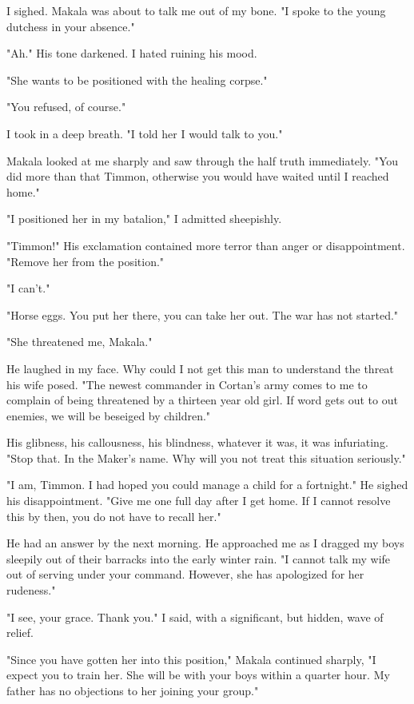 \documentclass{article}
\begin{document}
I sighed. Makala was about to talk me out of my bone. "I spoke to the young dutchess in your absence."

"Ah." His tone darkened. I hated ruining his mood.

"She wants to be positioned with the healing corpse."

"You refused, of course."

I took in a deep breath. "I told her I would talk to you."

Makala looked at me sharply and saw through the half truth immediately. "You did more than that Timmon, otherwise you would have waited until I reached home."

"I positioned her in my batalion," I admitted sheepishly.

"Timmon!" His exclamation contained more terror than anger or disappointment. "Remove her from the position."

"I can't."

"Horse eggs. You put her there, you can take her out. The war has not started."

"She threatened me, Makala."

He laughed in my face. Why could I not get this man to understand the threat his wife posed. "The newest commander in Cortan's army comes to me to complain of being threatened by a thirteen year old girl. If word gets out to out enemies, we will be beseiged by children."

His glibness, his callousness, his blindness, whatever it was, it was infuriating. "Stop that. In the Maker's name. Why will you not treat this situation seriously."

"I am, Timmon. I had hoped you could manage a child for a fortnight." He sighed his disappointment. "Give me one full day after I get home. If I cannot resolve this by then, you do not have to recall her."

He had an answer by the next morning. He approached me as I dragged my boys sleepily out of their barracks into the early winter rain. "I cannot talk my wife out of serving under your command. However, she has apologized for her rudeness."

"I see, your grace. Thank you." I said, with a significant, but hidden, wave of relief.

"Since you have gotten her into this position," Makala continued sharply, "I expect you to train her. She will be with your boys within a quarter hour. My father has no objections to her joining your group."
\end{document}
